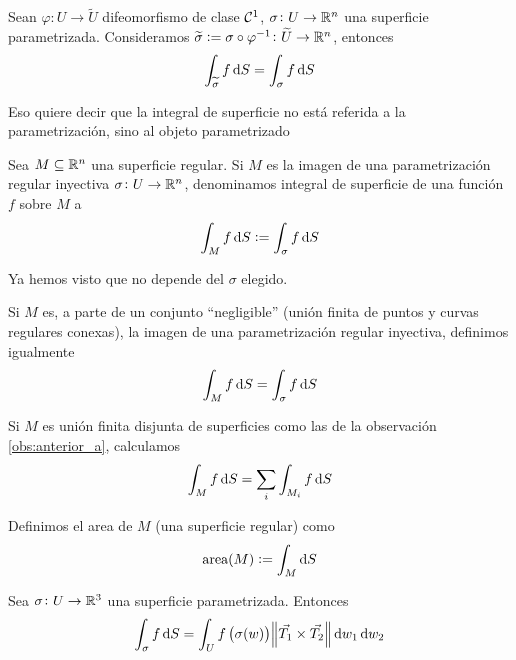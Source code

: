 \begin{lema}
    Sean $\varphi \colon U \to \widetilde{U}$ difeomorfismo de clase $\mathcal{C}^1$, $\sigma \colon U \to \mathbb{R}^n$ una superficie parametrizada.
    Consideramos $\widetilde{\sigma} := \sigma \circ \varphi^{-1} \colon \widetilde{U} \to \mathbb{R}^n$, entonces
    \[
        \int_{\widetilde{\sigma}} f \dif S = \int_\sigma f \dif S
    \]
\end{lema}

\begin{obs*}
    Eso quiere decir que la integral de superficie no está referida a la parametrización, sino al objeto parametrizado
\end{obs*}

\begin{defi}
    Sea $M \subseteq \mathbb{R}^n$ una superficie regular. Si $M$ es la imagen de una parametrización regular inyectiva $\sigma \colon U \to \mathbb{R}^n$,
    denominamos integral de superficie de una función $f$ sobre $M$ a
    \[
        \int_M f \dif S := \int_\sigma f \dif S
    \]
\end{defi}

\begin{obs*}
    Ya hemos visto que no depende del $\sigma$ elegido.
\end{obs*}

\begin{obs}\label{obs:anterior_a}
    Si $M$ es, a parte de un conjunto ``negligible'' (unión finita de puntos y curvas regulares conexas), la imagen de una parametrización regular inyectiva,
    definimos igualmente
    \[
        \int_M f \dif S = \int_\sigma f \dif S
    \]
\end{obs}

\begin{obs*}
    Si $M$ es unión finita disjunta de superficies como las de la observación \ref{obs:anterior_a}, calculamos
    \[
        \int_M f \dif S = \sum_i \int_{M_i} f \dif S
    \]
\end{obs*}

\begin{defi}
    Definimos el area de $M$ (una superficie regular) como
    \[
        \text{area}(M) := \int_M \dif S
    \]
\end{defi}

\begin{lema}
    Sea $\sigma \colon U \to \mathbb{R}^3$ una superficie parametrizada. Entonces
    \[
        \int_\sigma f \dif S = \int_U f\left( \sigma(w) \right) \norm{\vec{T_1} \times \vec{T_2}} \dif w_1 \dif w_2
    \]
\end{lema}

